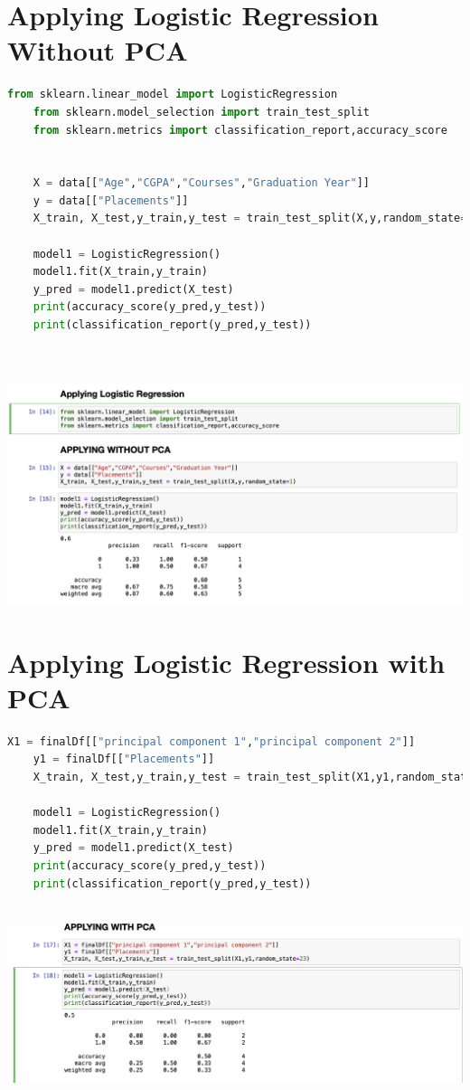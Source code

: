 \documentclass{article}
\begin{document}
\section{Applying Logistic Regression Without PCA }
\begin{lstlisting}[language=Python]
	from sklearn.linear_model import LogisticRegression
	from sklearn.model_selection import train_test_split
	from sklearn.metrics import classification_report,accuracy_score
	
	
	X = data[["Age","CGPA","Courses","Graduation Year"]]
	y = data[["Placements"]]
	X_train, X_test,y_train,y_test = train_test_split(X,y,random_state=1)
	
	model1 = LogisticRegression()
	model1.fit(X_train,y_train)
	y_pred = model1.predict(X_test)
	print(accuracy_score(y_pred,y_test))
	print(classification_report(y_pred,y_test))
	
	
\end{lstlisting}
\includegraphics[scale=0.45]{images/6.png}
\section{Applying Logistic Regression with PCA}
\begin{lstlisting}[language=Python]
	X1 = finalDf[["principal component 1","principal component 2"]]
	y1 = finalDf[["Placements"]]
	X_train, X_test,y_train,y_test = train_test_split(X1,y1,random_state=23)
	
	model1 = LogisticRegression()
	model1.fit(X_train,y_train)
	y_pred = model1.predict(X_test)
	print(accuracy_score(y_pred,y_test))
	print(classification_report(y_pred,y_test))
	
\end{lstlisting}
\includegraphics[scale=0.4]{images/7.png}
\end{document}
